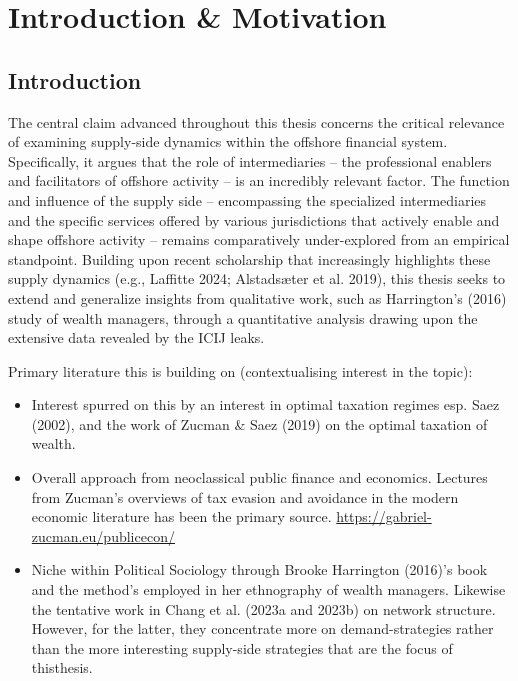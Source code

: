 \chapter{Introduction \& Motivation}
\label{chap:introduction}

\section{Introduction} 
\label{sec:1_0}

The central claim advanced throughout this thesis concerns the critical relevance of examining supply-side dynamics within the offshore financial system. Specifically, it argues that the role of intermediaries – the professional enablers and facilitators of offshore activity – is an incredibly relevant factor. The function and influence of the supply side – encompassing the specialized intermediaries and the specific services offered by various jurisdictions that actively enable and shape offshore activity – remains comparatively under-explored from an empirical standpoint. Building upon recent scholarship that increasingly highlights these supply dynamics (e.g., Laffitte 2024; Alstadsæter et al. 2019), this thesis seeks to extend and generalize insights from qualitative work, such as Harrington's (2016) study of wealth managers, through a quantitative analysis drawing upon the extensive data revealed by the ICIJ leaks.

Primary literature this is building on (contextualising interest in the topic):
\begin{itemize}
    \item Interest spurred on this by an interest in optimal taxation regimes esp. Saez (2002), and the work of Zucman \& Saez (2019) on the optimal taxation of wealth. 
    \item Overall approach from neoclassical public finance and economics. Lectures from Zucman's overviews of tax evasion and avoidance in the modern economic literature has been the primary source. \url{https://gabriel-zucman.eu/publicecon/}
    \item Niche within Political Sociology through Brooke Harrington (2016)'s book and the method's employed in her ethnography of wealth managers. Likewise the tentative work in Chang et al. (2023a and 2023b) on network structure. However, for the latter, they concentrate more on demand-strategies rather than the more interesting supply-side strategies that are the focus of thisthesis.
\end{itemize}

